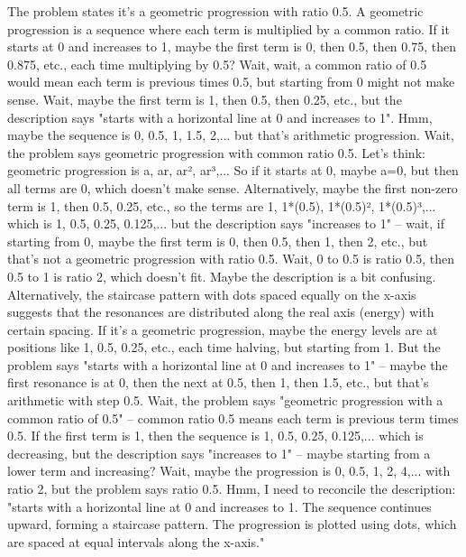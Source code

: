 The problem states it's a geometric progression with ratio 0.5. A geometric progression is a sequence where each term is multiplied by a common ratio. If it starts at 0 and increases to 1, maybe the first term is 0, then 0.5, then 0.75, then 0.875, etc., each time multiplying by 0.5? Wait, wait, a common ratio of 0.5 would mean each term is previous times 0.5, but starting from 0 might not make sense. Wait, maybe the first term is 1, then 0.5, then 0.25, etc., but the description says "starts with a horizontal line at 0 and increases to 1". Hmm, maybe the sequence is 0, 0.5, 1, 1.5, 2,... but that's arithmetic progression. Wait, the problem says geometric progression with common ratio 0.5. Let's think: geometric progression is a, ar, ar², ar³,... So if it starts at 0, maybe a=0, but then all terms are 0, which doesn't make sense. Alternatively, maybe the first non-zero term is 1, then 0.5, 0.25, etc., so the terms are 1, 1*(0.5), 1*(0.5)², 1*(0.5)³,... which is 1, 0.5, 0.25, 0.125,... but the description says "increases to 1" – wait, if starting from 0, maybe the first term is 0, then 0.5, then 1, then 2, etc., but that's not a geometric progression with ratio 0.5. Wait, 0 to 0.5 is ratio 0.5, then 0.5 to 1 is ratio 2, which doesn't fit. Maybe the description is a bit confusing. Alternatively, the staircase pattern with dots spaced equally on the x-axis suggests that the resonances are distributed along the real axis (energy) with certain spacing. If it's a geometric progression, maybe the energy levels are at positions like 1, 0.5, 0.25, etc., each time halving, but starting from 1. But the problem says "starts with a horizontal line at 0 and increases to 1" – maybe the first resonance is at 0, then the next at 0.5, then 1, then 1.5, etc., but that's arithmetic with step 0.5. Wait, the problem says "geometric progression with a common ratio of 0.5" – common ratio 0.5 means each term is previous term times 0.5. If the first term is 1, then the sequence is 1, 0.5, 0.25, 0.125,... which is decreasing, but the description says "increases to 1" – maybe starting from a lower term and increasing? Wait, maybe the progression is 0, 0.5, 1, 2, 4,... with ratio 2, but the problem says ratio 0.5. Hmm, I need to reconcile the description: "starts with a horizontal line at 0 and increases to 1. The sequence continues upward, forming a staircase pattern. The progression is plotted using dots, which are spaced at equal intervals along the x-axis."

